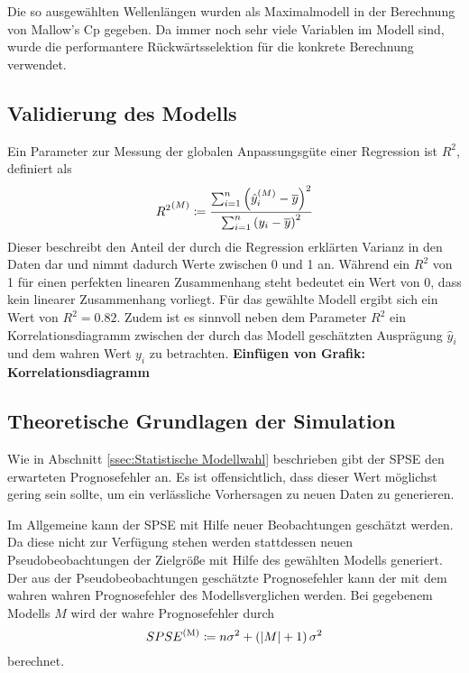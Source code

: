 	Die so ausgewählten Wellenlängen wurden als Maximalmodell in der Berechnung von Mallow's Cp gegeben. Da immer noch sehr viele Variablen im Modell sind, wurde die performantere Rückwärtsselektion für die konkrete Berechnung verwendet.


	\subsection{Validierung des Modells}
	\label{ssec:model-validation}
	   Ein Parameter zur Messung der globalen Anpassungsgüte einer Regression ist $R^2$, definiert als \cite{Lang2007}
		\[
			{R^2}^{(M)} \coloneqq \frac {\sum_{i=1}^n \left( \hat{y}^{(M)}_i - \overline{y} \right)^2}{\sum_{i=1}^n \left( y_i - \overline{y} \right)^2}
		\]
		Dieser beschreibt den Anteil der durch die Regression erklärten Varianz in den Daten dar und nimmt dadurch Werte zwischen 0 und 1 an.
		Während ein $R^2$ von 1 für einen perfekten linearen Zusammenhang steht bedeutet ein Wert von 0, dass kein linearer Zusammenhang vorliegt.
		Für das gewählte Modell ergibt sich ein Wert von $R^2 =  0.82$.
		Zudem ist es sinnvoll neben dem Parameter $R^2$ ein Korrelationsdiagramm zwischen der durch das Modell geschätzten Ausprägung $\hat{y}_i$ und dem wahren Wert $y_i$ zu betrachten.
		\textbf{Einfügen von Grafik: Korrelationsdiagramm}




	\subsection{Theoretische Grundlagen der Simulation}
	\label{ssec:Theoretische Grundlagen der Simulation}

        Wie in Abschnitt \ref{ssec:Statistische Modellwahl} beschrieben gibt der SPSE den erwarteten Prognosefehler an.
        Es ist offensichtlich, dass dieser Wert möglichst gering sein sollte, um ein verlässliche Vorhersagen zu neuen Daten zu generieren.

        Im Allgemeine kann der SPSE mit Hilfe neuer Beobachtungen geschätzt werden.\cite{Schumacher Skript}
        Da diese nicht zur Verfügung stehen werden stattdessen neuen Pseudobeobachtungen der Zielgröße mit Hilfe des gewählten Modells generiert.
        Der aus der Pseudobeobachtungen geschätzte Prognosefehler kann der mit dem wahren wahren Prognosefehler des Modellsverglichen werden.
        Bei gegebenem Modells $M$ wird der wahre Prognosefehler durch
        \[
            SPSE^{\mathrm{(M)}} \coloneqq  n \sigma^2 + \left( \left\vert M \right\vert+1 \right) \sigma^2
        \]
        berechnet.

